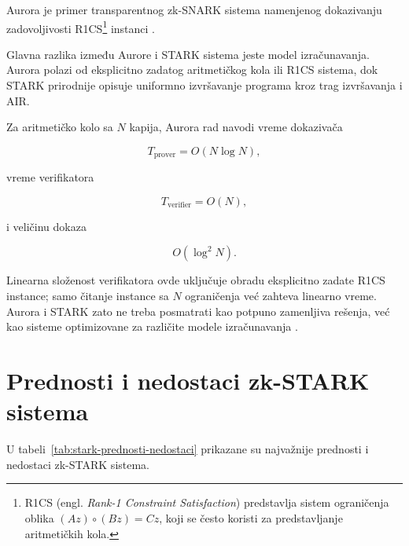 Aurora je primer transparentnog zk-SNARK sistema namenjenog dokazivanju
zadovoljivosti R1CS\footnote{R1CS
(engl. \textit{Rank-1 Constraint Satisfaction}) predstavlja sistem ograničenja
oblika \((Az)\circ(Bz)=Cz\), koji se često koristi za predstavljanje aritmetičkih
kola.} instanci \cite{aurora2019}.

Glavna razlika između Aurore i STARK sistema jeste model izračunavanja. Aurora
polazi od eksplicitno zadatog aritmetičkog kola ili R1CS sistema, dok STARK
prirodnije opisuje uniformno izvršavanje programa kroz trag izvršavanja i AIR.

Za aritmetičko kolo sa \(N\) kapija, Aurora rad navodi vreme dokazivača

\begin{equation}
    T_{\mathrm{prover}} = O(N\log N),
\end{equation}

vreme verifikatora

\begin{equation}
    T_{\mathrm{verifier}} = O(N),
\end{equation}

i veličinu dokaza

\begin{equation}
    O\left(\log^2 N\right).
\end{equation}

Linearna složenost verifikatora ovde uključuje obradu eksplicitno zadate R1CS
instance; samo čitanje instance sa \(N\) ograničenja već zahteva linearno vreme.
Aurora i STARK zato ne treba posmatrati kao potpuno zamenljiva rešenja, već kao
sisteme optimizovane za različite modele izračunavanja \cite{aurora2019}.

\clearpage

\section{Prednosti i nedostaci zk-STARK sistema}

U tabeli~\ref{tab:stark-prednosti-nedostaci} prikazane su najvažnije prednosti
i nedostaci zk-STARK sistema.

